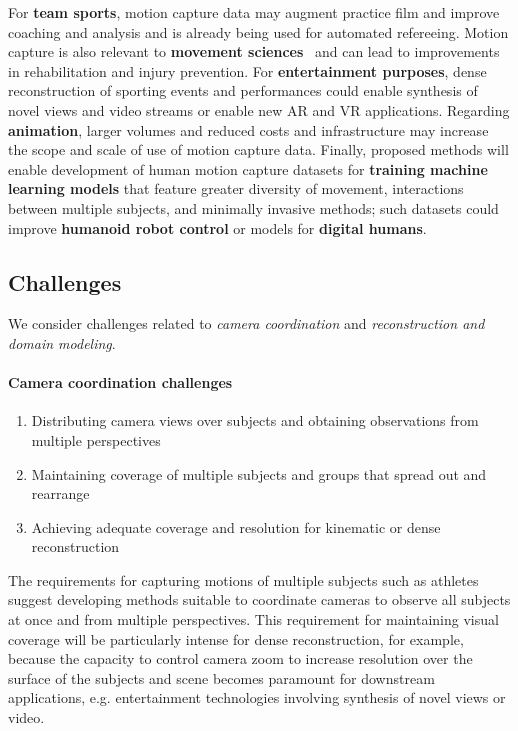 \documentclass[11pt]{article}
\begin{document}
For \textbf{team sports}, motion capture data may augment practice film and
improve coaching and analysis and is already being used for automated
refereeing.
Motion capture is also relevant to
\textbf{movement sciences}~\citep{wade2022peerj,nakano2020} and can lead
to improvements in rehabilitation and injury prevention.
For \textbf{entertainment purposes}, dense reconstruction of sporting events
and performances could enable synthesis of novel views and video streams or
enable new AR and VR applications.
Regarding \textbf{animation}, larger volumes and reduced costs and
infrastructure may increase the scope and scale of use of motion capture data.
Finally, proposed methods will enable development of human motion capture
datasets for \textbf{training machine learning models} that feature greater
diversity of movement, interactions between multiple subjects, and minimally
invasive methods; such datasets could improve \textbf{humanoid robot control} or
models for \textbf{digital humans}.


\subsection{Challenges}

We consider challenges related to \emph{camera coordination} and
\emph{reconstruction and domain modeling}.


\paragraph{Camera coordination challenges}

\begin{enumerate}[resume,itemsep=0.3ex,topsep=0.3ex]
  \item Distributing camera views over subjects and obtaining observations from
    multiple perspectives
  \item Maintaining coverage of multiple subjects and groups that spread out and
    rearrange
  \item Achieving adequate coverage and resolution for kinematic or dense
    reconstruction
\end{enumerate}
The requirements for capturing motions of multiple subjects such as athletes
suggest developing methods suitable to coordinate cameras to observe all
subjects at once and from multiple perspectives.
This requirement for
maintaining visual coverage will be particularly intense for dense
reconstruction,
for example, because the capacity to control camera zoom to increase resolution
over the surface of the subjects and scene becomes
paramount for downstream applications, e.g. entertainment technologies involving
synthesis of novel views or video.
%
\end{document}
